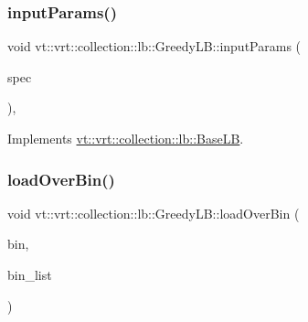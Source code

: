 \mbox{\label{structvt_1_1vrt_1_1collection_1_1lb_1_1_greedy_l_b_aec90a76fdcb1d57c9edfb6403bcc5181}} 
\subsubsection{\texorpdfstring{input\+Params()}{inputParams()}}
{\footnotesize\ttfamily void vt\+::vrt\+::collection\+::lb\+::\+Greedy\+L\+B\+::input\+Params (\begin{DoxyParamCaption}\item[{\hyperlink{structvt_1_1vrt_1_1collection_1_1balance_1_1_spec_entry}{balance\+::\+Spec\+Entry} $\ast$}]{spec }\end{DoxyParamCaption})\hspace{0.3cm}{\ttfamily [override]}, {\ttfamily [virtual]}}



Implements \hyperlink{structvt_1_1vrt_1_1collection_1_1lb_1_1_base_l_b_a555e29aadfd428383464d6dd007506b6}{vt\+::vrt\+::collection\+::lb\+::\+Base\+LB}.

\mbox{\label{structvt_1_1vrt_1_1collection_1_1lb_1_1_greedy_l_b_a2eebe9945964c405c237ae025d901c93}} 
\subsubsection{\texorpdfstring{load\+Over\+Bin()}{loadOverBin()}}
{\footnotesize\ttfamily void vt\+::vrt\+::collection\+::lb\+::\+Greedy\+L\+B\+::load\+Over\+Bin (\begin{DoxyParamCaption}\item[{\hyperlink{structvt_1_1vrt_1_1collection_1_1lb_1_1_base_l_b_ae0bff8fcf0dec0abc1d81836cf1d060a}{Obj\+Bin\+Type}}]{bin,  }\item[{\hyperlink{structvt_1_1vrt_1_1collection_1_1lb_1_1_base_l_b_ab29c64ca66a928f34cf638dad6163f80}{Obj\+Bin\+List\+Type} \&}]{bin\+\_\+list }\end{DoxyParamCaption})\hspace{0.3cm}{\ttfamily [private]}}

